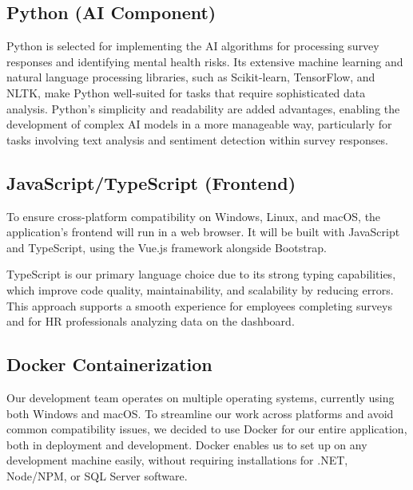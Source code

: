 \documentclass[conference]{IEEEtran}
\begin{document}
        \subsection {Python (AI Component)}

            Python is selected for implementing the AI algorithms for processing survey responses and identifying mental health risks. Its extensive machine learning and natural language processing libraries, such as Scikit-learn, TensorFlow, and NLTK, make Python well-suited for tasks that require sophisticated data analysis. Python’s simplicity and readability are added advantages, enabling the development of complex AI models in a more manageable way, particularly for tasks involving text analysis and sentiment detection within 
            survey responses.
            \newline


        \subsection {JavaScript/TypeScript (Frontend)}

            To ensure cross-platform compatibility on Windows, Linux, 
            and macOS, the application's frontend will run in a web 
            browser. It will be built with JavaScript and TypeScript, 
            using the Vue.js framework alongside Bootstrap. 
            \newline
            
            TypeScript is our primary language choice due to its strong typing capabilities, which improve code quality, maintainability, and scalability by reducing errors. This approach supports a smooth experience for employees completing surveys and for HR professionals analyzing data on the dashboard.
            \newline

        \subsection {Docker Containerization}

            Our development team operates on multiple operating systems, 
            currently using both Windows and macOS. To streamline our 
            work across platforms and avoid common compatibility issues, 
            we decided to use Docker for our entire application, both in 
            deployment and development. Docker enables us to set up on 
            any development machine easily, without requiring installations 
            for .NET, Node/NPM, or SQL Server software. \newline
            
\end{document}
